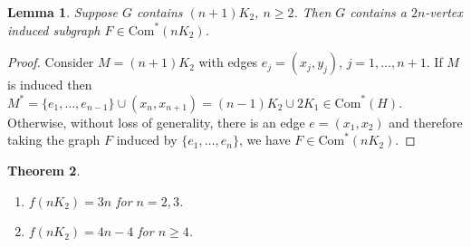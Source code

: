 \documentclass[a4paper,12pt]{article}
\newtheorem{theorem}{Theorem}[section]
\newtheorem{lemma}[theorem]{Lemma}
\begin{document}
\begin{lemma}
\label{l:nK2}
Suppose $G$ contains $(n+1)K_2$, $n \ge 2$. Then $G$ contains a $2n$-vertex induced subgraph $F \in \text{Com}^*(nK_2)$.
\end{lemma}

\begin{proof}
Consider $M = (n+1)K_2$ with edges $e_j = (x_j, y_j)$, $j = 1, \dots, n+1$.
If $M$ is induced then $M^* = \{ e_1, \dots, e_{n-1} \} \cup (x_n, x_{n+1}) = (n-1)K_2 \cup 2K_1 \in \text{Com}^*(H)$.
Otherwise, without loss of generality, there is an edge $e = (x_1, x_2)$ and therefore taking the graph $F$ induced by $\{ e_1, \dots, e_{n} \}$, we have $F \in \text{Com}^*(nK_2)$.
\end{proof}


\begin{theorem}
$\mbox{ }$\
\begin{enumerate}
\item{$f(nK_2)=3n$ for $n=2,3$.}
\item{$f(nK_2)=4n-4$ for $n \geq 4$.}
\end{enumerate}
\end{theorem}
\end{document}

